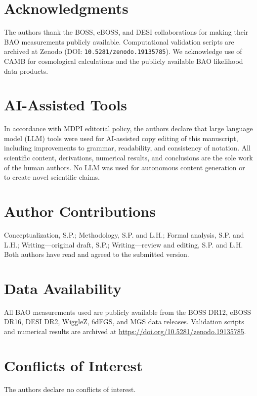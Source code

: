 \documentclass[12pt,a4paper]{article}
\begin{document}
\section*{Acknowledgments}

The authors thank the BOSS, eBOSS, and DESI collaborations for making their
BAO measurements publicly available. Computational validation scripts are
archived at Zenodo (DOI: \texttt{10.5281/zenodo.19135785}). We acknowledge
use of CAMB for cosmological calculations and the publicly available BAO
likelihood data products.

\section*{AI-Assisted Tools}

In accordance with MDPI editorial policy, the authors declare that large
language model (LLM) tools were used for AI-assisted copy editing of this
manuscript, including improvements to grammar, readability, and consistency
of notation. All scientific content, derivations, numerical results, and
conclusions are the sole work of the human authors. No LLM was used for
autonomous content generation or to create novel scientific claims.

\section*{Author Contributions}

Conceptualization, S.P.; Methodology, S.P. and L.H.; Formal analysis, S.P.
and L.H.; Writing---original draft, S.P.; Writing---review and editing, S.P.
and L.H. Both authors have read and agreed to the submitted version.

\section*{Data Availability}

All BAO measurements used are publicly available from the BOSS DR12, eBOSS DR16,
DESI DR2, WiggleZ, 6dFGS, and MGS data releases. Validation scripts and
numerical results are archived at
\url{https://doi.org/10.5281/zenodo.19135785}.

\section*{Conflicts of Interest}

The authors declare no conflicts of interest.



\end{document}
